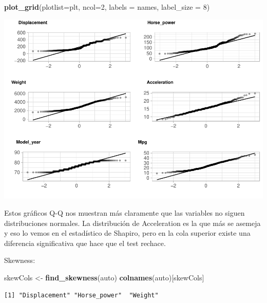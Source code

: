 \documentclass[
]{article}
\newenvironment{Shaded}{\begin{snugshade}}{\end{snugshade}}
\newcommand{\DataTypeTok}[1]{\textcolor[rgb]{0.13,0.29,0.53}{#1}}
\newcommand{\DecValTok}[1]{\textcolor[rgb]{0.00,0.00,0.81}{#1}}
\newcommand{\KeywordTok}[1]{\textcolor[rgb]{0.13,0.29,0.53}{\textbf{#1}}}
\newcommand{\NormalTok}[1]{#1}
\newcommand{\OperatorTok}[1]{\textcolor[rgb]{0.81,0.36,0.00}{\textbf{#1}}}
\newcommand{\StringTok}[1]{\textcolor[rgb]{0.31,0.60,0.02}{#1}}
\begin{document}
\begin{Shaded}
\begin{Highlighting}[]
\KeywordTok{plot_grid}\NormalTok{(}\DataTypeTok{plotlist=}\NormalTok{plt, }\DataTypeTok{ncol=}\DecValTok{2}\NormalTok{, }\DataTypeTok{labels =}\NormalTok{ names, }\DataTypeTok{label_size =} \DecValTok{8}\NormalTok{)}
\end{Highlighting}
\end{Shaded}

\begin{center}\includegraphics{EDA_files/figure-latex/unnamed-chunk-14-7} \end{center}

Estos gráficos Q-Q nos muestran más claramente que las variables no
siguen distribuciones normales. La distribución de Acceleration es la
que más se asemeja y eso lo vemos en el estadístico de Shapiro, pero en
la cola superior existe una diferencia significativa que hace que el
test rechace.

Skewness:

\begin{Shaded}
\begin{Highlighting}[]
\NormalTok{skewCols <-}\StringTok{ }\KeywordTok{find_skewness}\NormalTok{(auto)}
\KeywordTok{colnames}\NormalTok{(auto)[skewCols]}
\end{Highlighting}
\end{Shaded}

\begin{verbatim}
[1] "Displacement" "Horse_power"  "Weight"      
\end{verbatim}

\begin{Shaded}
\end{Shaded}
\end{document}
